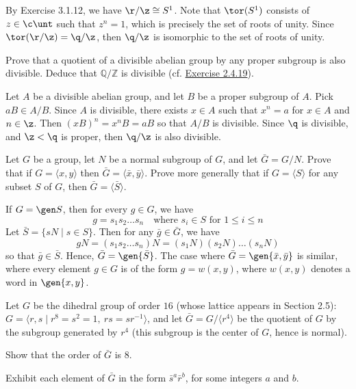 \begin{problems}
\begin{solalph}
        \item By Exercise 3.1.12, we have $\r/\z \cong S^1$. Note that $\tor(S^1)$ consists of $z \in \c\unt$ such that $z^n = 1$, which is precisely the set of roots of unity. Since $\tor(\r/\z) = \q/\z$, then $\q/\z$ is isomorphic to the set of roots of unity.
    \end{solalph}
    \item \label{ex3.1.15} Prove that a quotient of a divisible abelian group by any proper subgroup is also divisible. Deduce that $\mathbb{Q}/\mathbb{Z}$ is divisible (cf. \hyperref[ex2.4.19]{Exercise 2.4.19}).
    \begin{sol}
        Let $A$ be a divisible abelian group, and let $B$ be a proper subgroup of $A$. Pick $aB \in A/B$. Since $A$ is divisible, there exists $x \in A$ such that $x^n = a$ for $x \in A$ and $n \in \z$. Then $(xB)^n = x^nB = aB$ so that $A/B$ is divisible. Since $\q$ is divisible, and $\z < \q$ is proper, then $\q/\z$ is also divisible.
    \end{sol}
    \item Let $G$ be a group, let $N$ be a normal subgroup of $G$, and let $\bar{G} = G/N$. Prove that if $G = \langle x, y \rangle$ then $\bar{G} = \langle \bar{x}, \bar{y} \rangle$. Prove more generally that if $G = \langle S \rangle$ for any subset $S$ of $G$, then $\bar{G} = \langle \bar{S} \rangle$.
    \begin{sol}
        If $G = \gen S$, then for every $g \in G$, we have
        \[g = s_1s_2 \dots s_n \quad \text{where $s_i \in S$ for $1 \le i \le n$}\]
        Let $\bar S = \{sN \mid s \in S\}$. Then for any $\bar g \in \bar G$, we have
        \[gN = (s_1s_2 \ldots s_n)N = (s_1N)(s_2N) \dots (s_nN)\]
        so that $\bar g \in \bar S$. Hence, $\bar G = \gen{\bar S}$. The case where $\bar G = \gen{\bar x, \bar y}$ is similar, where every element $g \in G$ is of the form $g = w(x, y)$, where $w(x, y)$ denotes a word in $\gen{x, y}$.
    \end{sol}
    \item Let $G$ be the dihedral group of order $16$ (whose lattice appears in Section 2.5): $G = \langle r,s \mid r^8 = s^2 = 1,\ rs = sr^{-1} \rangle$, and let $\bar{G} = G/\langle r^4 \rangle$ be the quotient of $G$ by the subgroup generated by $r^4$ (this subgroup is the center of $G$, hence is normal).
    \begin{problems}
        \item Show that the order of $\bar{G}$ is $8$.
        \item Exhibit each element of $\bar{G}$ in the form $\bar{s}^a \bar{r}^b$, for some integers $a$ and $b$.

\end{problems}
\end{problems}
